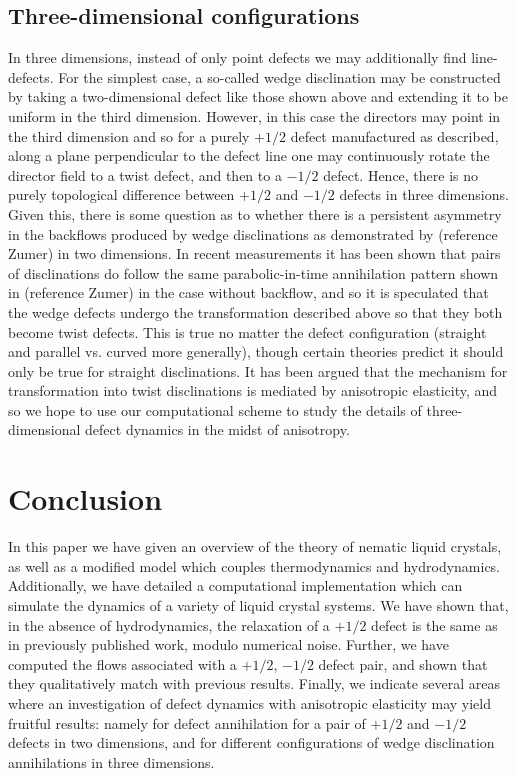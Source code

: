 \documentclass[reqno]{article}
\begin{document}
  \subsection{Three-dimensional configurations}
  In three dimensions, instead of only point defects we may additionally
  find line-defects.
  For the simplest case, a so-called wedge disclination may be constructed by
  taking a two-dimensional
  defect like those shown above and extending it to be uniform in the third
  dimension.
  However, in this case the directors may point in the third dimension and so
  for a purely $+1/2$ defect manufactured as described, along a plane
  perpendicular to the defect line one may continuously rotate the director
  field to a twist defect, and then to a $-1/2$ defect.
  Hence, there is no purely topological difference between $+1/2$ and $-1/2$
  defects in three dimensions.
  Given this, there is some question as to whether there is a persistent
  asymmetry in the backflows produced by wedge disclinations as demonstrated by
  (reference Zumer) in two dimensions.
  In recent measurements it has been shown that pairs of disclinations do follow
  the same parabolic-in-time annihilation pattern shown in (reference Zumer) in
  the case without backflow, and so it is speculated that the wedge defects
  undergo the transformation described above so that they both become twist
  defects.
  This is true no matter the defect configuration (straight and parallel vs.
  curved more generally), though certain theories predict it should only be true
  for straight disclinations.
  It has been argued that the mechanism for transformation into twist
  disclinations is mediated by anisotropic elasticity, and so we hope to use our
  computational scheme to study the details of three-dimensional defect dynamics
  in the midst of anisotropy.

  \section{Conclusion}
  In this paper we have given an overview of the theory of nematic liquid
  crystals, as well as a modified model which couples thermodynamics and
  hydrodynamics. 
  Additionally, we have detailed a computational implementation which can
  simulate the dynamics of a variety of liquid crystal systems.
  We have shown that, in the absence of hydrodynamics, the relaxation of a
  $+1/2$ defect is the same as in previously published work, modulo numerical
  noise.
  Further, we have computed the flows associated with a $+1/2$, $-1/2$ defect
  pair, and shown that they qualitatively match with previous results.
  Finally, we indicate several areas where an investigation of defect dynamics
  with anisotropic elasticity may yield fruitful results: namely for defect
  annihilation for a pair of $+1/2$ and $-1/2$ defects in two dimensions, and
  for different configurations of wedge disclination annihilations in three
  dimensions. 
  
\end{document}
